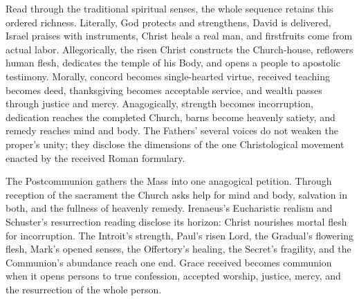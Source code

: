 Read through the traditional spiritual senses, the whole sequence retains
this ordered richness. Literally, God protects and strengthens, David is
delivered, Israel praises with instruments, Christ heals a real man, and
firstfruits come from actual labor. Allegorically, the risen Christ constructs
the Church-house, reflowers human flesh, dedicates the temple of his Body, and
opens a people to apostolic testimony. Morally, concord becomes single-hearted
virtue, received teaching becomes deed, thanksgiving becomes acceptable
service, and wealth passes through justice and mercy. Anagogically, strength
becomes incorruption, dedication reaches the completed Church, barns become
heavenly satiety, and remedy reaches mind and body. The Fathers' several voices
do not weaken the proper's unity; they disclose the dimensions of the one
Christological movement enacted by the received Roman formulary.

The Postcommunion gathers the Mass into one anagogical petition. Through
reception of the sacrament the Church asks help for mind and body, salvation in
both, and the fullness of heavenly remedy. Irenaeus's Eucharistic realism and
Schuster's resurrection reading disclose its horizon: Christ nourishes mortal
flesh for incorruption. The Introit's strength, Paul's risen Lord, the
Gradual's flowering flesh, Mark's opened senses, the Offertory's healing, the
Secret's fragility, and the Communion's abundance reach one end. Grace received
becomes communion when it opens persons to true confession, accepted worship,
justice, mercy, and the resurrection of the whole person.

\endgroup

\label{triptych:brief-synthesis:end}
\clearpage
